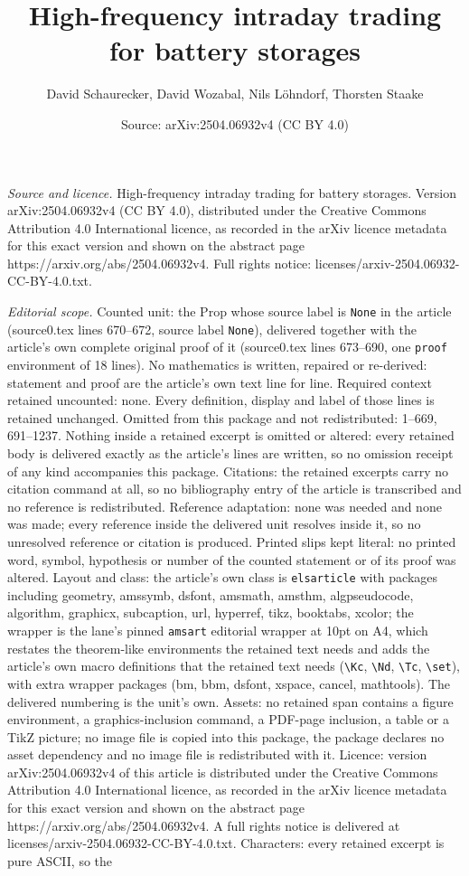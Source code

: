 \documentclass[10pt,a4paper]{amsart}
\title[High-frequency intraday trading for battery storages]{High-frequency intraday trading for battery storages}
\author{David Schaurecker, David Wozabal, Nils L\"ohndorf, Thorsten Staake}
\date{Source: arXiv:2504.06932v4 (CC BY 4.0)}
\begin{document}
\maketitle

\noindent\emph{Source and licence.} High-frequency intraday trading for battery storages. Version arXiv:2504.06932v4 (CC BY 4.0), distributed under the Creative Commons Attribution 4.0 International licence, as recorded in the arXiv licence metadata for this exact version and shown on the abstract page https://arxiv.org/abs/2504.06932v4. Full rights notice: licenses/arxiv-2504.06932-CC-BY-4.0.txt.\par\smallskip

\noindent\textit{Editorial scope.} Counted unit: the Prop whose source label is \texttt{None} in the article (source0.tex lines 670--672, source label \texttt{None}), delivered together with the article's own complete original proof of it (source0.tex lines 673--690, one \texttt{proof} environment of 18 lines). No mathematics is written, repaired or re-derived: statement and proof are the article's own text line for line. Required context retained uncounted: none. Every definition, display and label of those lines is retained unchanged. Omitted from this package and not redistributed: 1--669, 691--1237. Nothing inside a retained excerpt is omitted or altered: every retained body is delivered exactly as the article's lines are written, so no omission receipt of any kind accompanies this package. Citations: the retained excerpts carry no citation command at all, so no bibliography entry of the article is transcribed and no reference is redistributed. Reference adaptation: none was needed and none was made; every reference inside the delivered unit resolves inside it, so no unresolved reference or citation is produced. Printed slips kept literal: no printed word, symbol, hypothesis or number of the counted statement or of its proof was altered. Layout and class: the article's own class is \texttt{elsarticle} with packages including geometry, amssymb, dsfont, amsmath, amsthm, algpseudocode, algorithm, graphicx, subcaption, url, hyperref, tikz, booktabs, xcolor; the wrapper is the lane's pinned \texttt{amsart} editorial wrapper at 10pt on A4, which restates the theorem-like environments the retained text needs and adds the article's own macro definitions that the retained text needs (\texttt{\textbackslash Kc}, \texttt{\textbackslash Nd}, \texttt{\textbackslash Tc}, \texttt{\textbackslash set}), with extra wrapper packages (bm, bbm, dsfont, xspace, cancel, mathtools). The delivered numbering is the unit's own. Assets: no retained span contains a figure environment, a graphics-inclusion command, a PDF-page inclusion, a table or a TikZ picture; no image file is copied into this package, the package declares no asset dependency and no image file is redistributed with it. Licence: version arXiv:2504.06932v4 of this article is distributed under the Creative Commons Attribution 4.0 International licence, as recorded in the arXiv licence metadata for this exact version and shown on the abstract page https://arxiv.org/abs/2504.06932v4. A full rights notice is delivered at licenses/arxiv-2504.06932-CC-BY-4.0.txt. Characters: every retained excerpt is pure ASCII, so the 
\end{document}
